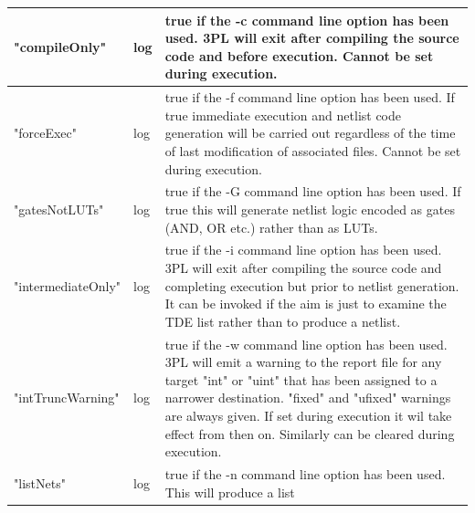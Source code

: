        \begin{tabular}{| l | l | p{10.0cm} |}
        \hline
        "compileOnly"       & log &  true if the -c command line option has
                                     been used. 3PL will exit after compiling
                                     the source code and before execution.
                                     Cannot be set during execution.
        \\ \hline
        "forceExec"         & log &  true if the -f command line option has
                                     been used. If true immediate execution
                                     and netlist code generation will be
                                     carried out regardless of the time of
                                     last modification of associated files.
                                     Cannot be set during execution.
        \\ \hline
        "gatesNotLUTs"      & log &  true if the -G command line option has
                                     been used. If true this will generate
                                     netlist logic encoded as gates (AND, OR
                                     etc.) rather than as LUTs.
        \\ \hline
        "intermediateOnly"  & log &  true if the -i command line option has
                                     been used. 3PL will exit after compiling
                                     the source code and completing execution
                                     but prior to netlist generation. It can be
                                     invoked if the aim is just to examine the
                                     TDE list rather than to produce a netlist.
        \\ \hline
        "intTruncWarning"   & log &  true if the -w command line option has
                                     been used. 3PL will emit a warning to the
                                     report file for any target "int" or "uint"
                                     that has been assigned to a narrower
                                     destination. "fixed" and "ufixed" warnings
                                     are always given. If set during execution
                                     it wil take effect from then on. Similarly
                                     can be cleared during execution.
        \\ \hline
        "listNets"          & log &  true if the -n command line option has
                                     been used. This will produce a list

\end{tabular}
